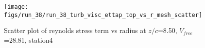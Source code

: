 \begin{figure}[H]
\centering
\texttt{[image: figs/run\_38/run\_38\_turb\_visc\_ettap\_top\_vs\_r\_mesh\_scatter]}
\caption{Scatter plot of reynolds stress term vs radius at $z/c$=8.50, $V_{free}$=28.81, station4}
\label{fig:run_38_turb_visc_ettap_top_vs_r_mesh_scatter}
\end{figure}


